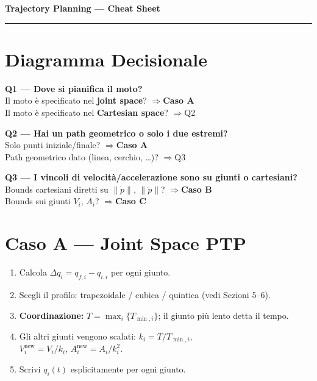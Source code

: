 \documentclass[10pt,a4paper]{article}
\begin{document}
{\centering
  {\Large\bfseries Trajectory Planning --- Cheat Sheet}\\[3pt]
  \hrule
  \vspace{6pt}
}

\section{Diagramma Decisionale}

\begin{amberbox}
\textbf{Q1 --- Dove si pianifica il moto?}\\
Il moto \`e specificato nel \textbf{joint space}? \quad$\Rightarrow$\quad \textbf{Caso A}\\
Il moto \`e specificato nel \textbf{Cartesian space}? \quad$\Rightarrow$\quad Q2

\medskip
\textbf{Q2 --- Hai un path geometrico o solo i due estremi?}\\
Solo punti iniziale/finale? \quad$\Rightarrow$\quad \textbf{Caso A}\\
Path geometrico dato (linea, cerchio, \ldots)? \quad$\Rightarrow$\quad Q3

\medskip
\textbf{Q3 --- I vincoli di velocit\`a/accelerazione sono su giunti o cartesiani?}\\
Bounds cartesiani diretti su $\|\dot{p}\|$, $\|\ddot{p}\|$? \quad$\Rightarrow$\quad \textbf{Caso B}\\
Bounds sui giunti $V_i$, $A_i$? \quad$\Rightarrow$\quad \textbf{Caso C}
\end{amberbox}

\section{Caso A --- Joint Space PTP}

\begin{cyanbox}
\begin{enumerate}
  \item Calcola $\Delta q_i = q_{f,i} - q_{i,i}$ per ogni giunto.
  \item Scegli il profilo: trapezoidale / cubica / quintica (vedi Sezioni 5--6).
  \item \textbf{Coordinazione:} $T = \max_i\{T_{\min,i}\}$; il giunto pi\`u lento detta il tempo.
  \item Gli altri giunti vengono scalati: \quad $k_i = T / T_{\min,i}$,\\
        \hspace*{1cm} $V_i^{\text{new}} = V_i / k_i$, \quad $A_i^{\text{new}} = A_i / k_i^2$.
  \item Scrivi $q_i(t)$ esplicitamente per ogni giunto.
\end{enumerate}
\end{cyanbox}
\end{document}
